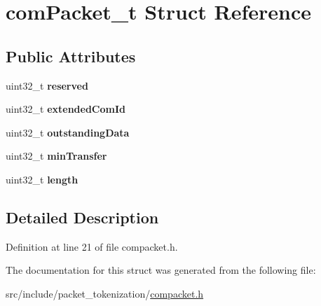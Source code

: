 \hypertarget{structcomPacket__t}{}\section{com\+Packet\+\_\+t Struct Reference}
\label{structcomPacket__t}
\subsection*{Public Attributes}
\begin{DoxyCompactItemize}
\item 
\hypertarget{structcomPacket__t_afd562a9771e00709589597bdd8d205da}{}uint32\+\_\+t {\bfseries reserved}\label{structcomPacket__t_afd562a9771e00709589597bdd8d205da}

\item 
\hypertarget{structcomPacket__t_aaaad918525b32a6eda2558d859eb0556}{}uint32\+\_\+t {\bfseries extended\+Com\+Id}\label{structcomPacket__t_aaaad918525b32a6eda2558d859eb0556}

\item 
\hypertarget{structcomPacket__t_a1e5976a1d1d9da2483cd0774d0b3a9d8}{}uint32\+\_\+t {\bfseries outstanding\+Data}\label{structcomPacket__t_a1e5976a1d1d9da2483cd0774d0b3a9d8}

\item 
\hypertarget{structcomPacket__t_ab3b98393cec963e926dc32eb478482ad}{}uint32\+\_\+t {\bfseries min\+Transfer}\label{structcomPacket__t_ab3b98393cec963e926dc32eb478482ad}

\item 
\hypertarget{structcomPacket__t_a67d88529c66cd8163fdd216b523c1f51}{}uint32\+\_\+t {\bfseries length}\label{structcomPacket__t_a67d88529c66cd8163fdd216b523c1f51}

\end{DoxyCompactItemize}


\subsection{Detailed Description}


Definition at line 21 of file compacket.\+h.



The documentation for this struct was generated from the following file\+:\begin{DoxyCompactItemize}
\item 
src/include/packet\+\_\+tokenization/\hyperlink{compacket_8h}{compacket.\+h}\end{DoxyCompactItemize}

